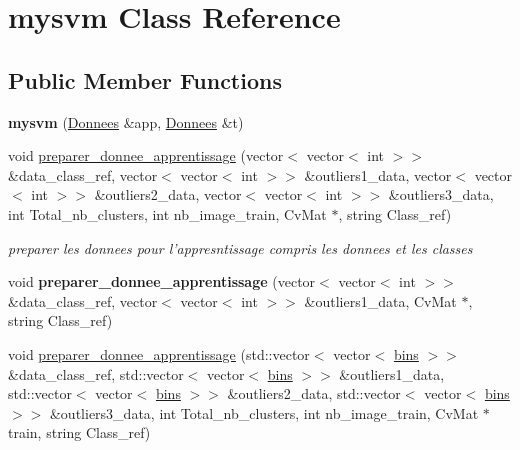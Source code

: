 \hypertarget{classmysvm}{
\section{mysvm Class Reference}
\label{classmysvm}
}
\subsection*{Public Member Functions}
\begin{DoxyCompactItemize}
\item 
\hypertarget{classmysvm_a24708823231bbfdc5c5d2bd911eca29c}{
{\bfseries mysvm} (\hyperlink{class_donnees}{Donnees} \&app, \hyperlink{class_donnees}{Donnees} \&t)}
\label{classmysvm_a24708823231bbfdc5c5d2bd911eca29c}

\item 
\hypertarget{classmysvm_a2a359f7916a750413655121cc9a6cf9d}{
void \hyperlink{classmysvm_a2a359f7916a750413655121cc9a6cf9d}{preparer\_\-donnee\_\-apprentissage} (vector$<$ vector$<$ int $>$$>$ \&data\_\-class\_\-ref, vector$<$ vector$<$ int $>$$>$ \&outliers1\_\-data, vector$<$ vector$<$ int $>$$>$ \&outliers2\_\-data, vector$<$ vector$<$ int $>$$>$ \&outliers3\_\-data, int Total\_\-nb\_\-clusters, int nb\_\-image\_\-train, CvMat $\ast$, string Class\_\-ref)}
\label{classmysvm_a2a359f7916a750413655121cc9a6cf9d}

\begin{DoxyCompactList}\small\item\em preparer les donnees pour l'appresntissage compris les donnees et les classes \end{DoxyCompactList}\item 
\hypertarget{classmysvm_a9e8618a8a9596f96852dbb1a23a0943f}{
void {\bfseries preparer\_\-donnee\_\-apprentissage} (vector$<$ vector$<$ int $>$$>$ \&data\_\-class\_\-ref, vector$<$ vector$<$ int $>$$>$ \&outliers1\_\-data, CvMat $\ast$, string Class\_\-ref)}
\label{classmysvm_a9e8618a8a9596f96852dbb1a23a0943f}

\item 
\hypertarget{classmysvm_a1509d40273024e88bf43d1dc9e0273ea}{
void \hyperlink{classmysvm_a1509d40273024e88bf43d1dc9e0273ea}{preparer\_\-donnee\_\-apprentissage} (std::vector$<$ vector$<$ \hyperlink{classbins}{bins} $>$$>$ \&data\_\-class\_\-ref, std::vector$<$ vector$<$ \hyperlink{classbins}{bins} $>$$>$ \&outliers1\_\-data, std::vector$<$ vector$<$ \hyperlink{classbins}{bins} $>$$>$ \&outliers2\_\-data, std::vector$<$ vector$<$ \hyperlink{classbins}{bins} $>$$>$ \&outliers3\_\-data, int Total\_\-nb\_\-clusters, int nb\_\-image\_\-train, CvMat $\ast$train, string Class\_\-ref)}
\label{classmysvm_a1509d40273024e88bf43d1dc9e0273ea}


\end{DoxyCompactItemize}
